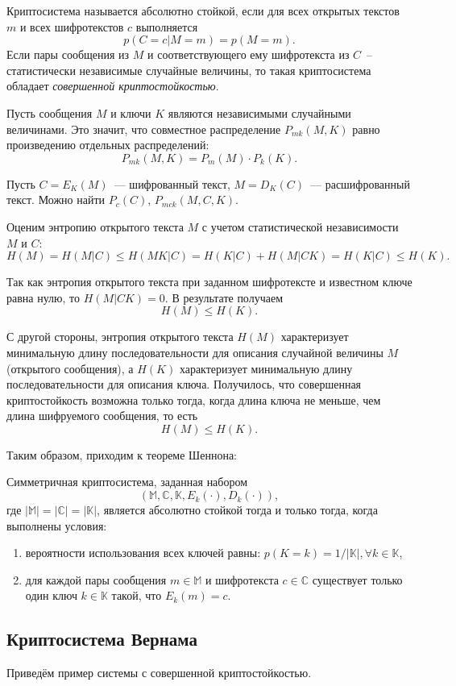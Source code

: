 Криптосистема называется абсолютно стойкой, если для всех открытых текстов $m$ и всех шифротекстов $c$ выполняется
$$ p(C = c|M = m) = p(M = m). $$
Если пары сообщения из $M$ и соответствующего ему шифротекста из $C$~-- статистически независимые случайные величины, 
то такая криптосистема обладает \textit{совершенной криптостойкостью}. 

Пусть сообщения $M$ и ключи $K$ являются независимыми случайными величинами. Это значит, что совместное распределение $P_{mk}(M, K)$ равно произведению отдельных распределений:
$$P_{mk}(M, K) = P_m(M) \cdot P_k(K).$$

Пусть $C = E_K(M)$~--- шифрованный текст, $M = D_K(C)$~--- расшифрованный текст. Можно найти $P_c(C)$, $P_{mck}(M, C, K).$

Оценим энтропию открытого текста $M$ с учетом статистической независимости $M$ и $C$:
$$H(M) = H(M|C) \leq H(MK|C) = H(K|C) + H(M|CK) = H(K|C) \leq H(K).$$

Так как энтропия открытого текста при заданном шифротексте и известном ключе равна нулю, то $H(M|CK) = 0$. В результате получаем
$$ H(M) \leq H(K). $$

С другой стороны, энтропия открытого текста $H(M)$ характеризует минимальную длину последовательности для описания случайной величины 
$M$ (открытого сообщения), а $H(K)$ характеризует минимальную длину последовательности для описания ключа. Получилось, что совершенная криптостойкость возможна 
только тогда, когда длина ключа не меньше, чем длина шифруемого сообщения, то есть
$$ H(M) \leq H(K). $$

Таким образом, приходим к теореме Шеннона:
\begin{theorem}
  Симметричная криптосистема, заданная набором $$ (\mathbb{M}, \mathbb{C}, \mathbb{K}, E_k(\cdot), D_k(\cdot)), $$
  где $|\mathbb{M}| = |\mathbb{C}| = |\mathbb{K}|$, является абсолютно стойкой тогда и только тогда, когда выполнены условия:
  \begin{enumerate}
    \item вероятности использования всех ключей равны: $p(K = k) = 1 / |\mathbb{K}|, \forall k \in \mathbb{K}$,
    \item для каждой пары сообщения $m \in \mathbb{M}$ и шифротекста $c \in \mathbb{C}$ существует только один ключ $k \in \mathbb{K}$ такой, что $E_k(m) = c$.
  \end{enumerate}
\end{theorem}


\subsection{Криптосистема Вернама}
Приведём пример системы с совершенной криптостойкостью.

